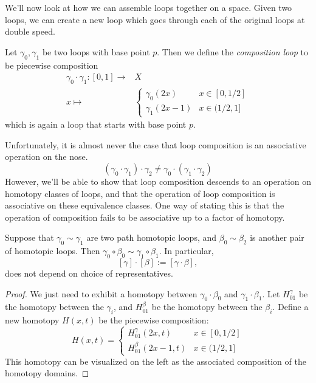 \begin{doubledtuftepage}
We'll now look at how we can assemble loops together on a space. Given two loops, we can create a new loop which goes through each of the original loops at double speed. 
\begin{definition}
	Let $\gamma_0,  \gamma_1$ be two loops with base point $p$. Then we define the \emph{composition loop} to be piecewise composition 
	\begin{align*}
	\gamma_0\cdot \gamma_1: [0, 1]\to& X\\ 
	 x\mapsto&\left\{\begin{array}{cc}
	                 	\gamma_0(2x) & x\in[0,  1/2]\\
	                 	\gamma_1(2x-1) & x\in (1/2,  1]
	                 \end{array}
 \right. 
	 \end{align*}
	 which is again a loop that starts with base point $p$.
\end{definition}
Unfortunately, it is almost never the case that loop composition is an associative operation on the nose.
\[(\gamma_0\cdot \gamma_1)\cdot \gamma_2\neq \gamma_0\cdot(\gamma_1\cdot \gamma_2)\] However, we'll be able to show that loop composition descends to an operation on homotopy classes of loops, and that the operation of loop composition is associative on these equivalence classes. One way of stating this is that the operation of composition fails to be associative up to a factor of homotopy.  
\begin{claim}
	Suppose that $\gamma_0\sim \gamma_1$ are two path homotopic loops,  and $\beta_0\sim \beta_2$ is another pair of homotopic loops. Then $\gamma_0\circ\beta_0 \sim \gamma_1\circ \beta_1$. In particular,  \[[\gamma]\cdot [\beta]:=[\gamma\cdot \beta],\]
	does not depend on choice of representatives.
\end{claim}
\begin{proof}

	We just need to exhibit 	a homotopy between  $\gamma_0\cdot \beta_0$ and $\gamma_1\cdot \beta_1$. Let $H^\gamma_{01}$ be the homotopy between the $\gamma_i$, and $H^\beta_{01}$ be the homotopy between the $\beta_i$. Define a new homotopy $H(x, t)$ be the piecewise composition:
	\[H(x, t)=\left\{ \begin{array}{cc} H^\gamma_{01}(2x, t) & x\in [0, 1/2]\\ H^\beta_{01} (2x-1, t) & x\in (1/2, 1]\end{array}\right.\]
	This homotopy can be visualized on the left as the associated composition of the homotopy domains. 


\end{proof}
\end{doubledtuftepage}
